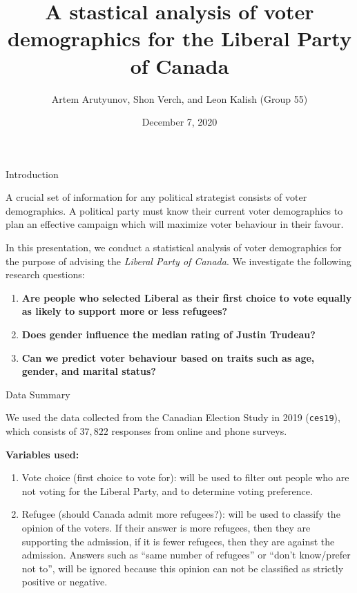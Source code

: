 \documentclass[
  ignorenonframetext,
]{beamer}
\title{A stastical analysis of voter demographics for the Liberal Party of
Canada}
\author{Artem Arutyunov, Shon Verch, and Leon Kalish (Group 55)}
\date{December 7, 2020}
\begin{document}
\frame{\titlepage}

\begin{frame}{Introduction}
\protect\hypertarget{introduction}{}

A crucial set of information for any political strategist consists of
voter demographics. A political party must know their current voter
demographics to plan an effective campaign which will maximize voter
behaviour in their favour.

In this presentation, we conduct a statistical analysis of voter
demographics for the purpose of advising the \emph{Liberal Party of
Canada}. We investigate the following research questions:

\begin{enumerate}
\item
  \textbf{Are people who selected Liberal as their first choice to vote
  equally as likely to support more or less refugees?}
\item
  \textbf{Does gender influence the median rating of Justin Trudeau?}
\item
  \textbf{Can we predict voter behaviour based on traits such as age,
  gender, and marital status?}
\end{enumerate}

\end{frame}

\begin{frame}[fragile]{Data Summary}
\protect\hypertarget{data-summary}{}

We used the data collected from the Canadian Election Study in 2019
(\texttt{ces19}), which consists of \(37,822\) responses from online and
phone surveys.

\textbf{Variables used:}

\begin{enumerate}
\item
  Vote choice (first choice to vote for): will be used to filter out
  people who are not voting for the Liberal Party, and to determine
  voting preference.
\item
  Refugee (should Canada admit more refugees?): will be used to classify
  the opinion of the voters. If their answer is more refugees, then they
  are supporting the admission, if it is fewer refugees, then they are
  against the admission. Answers such as ``same number of refugees'' or
  ``don't know/prefer not to'', will be ignored because this opinion can
  not be classified as strictly positive or negative.
\end{enumerate}

\end{frame}
\end{document}
